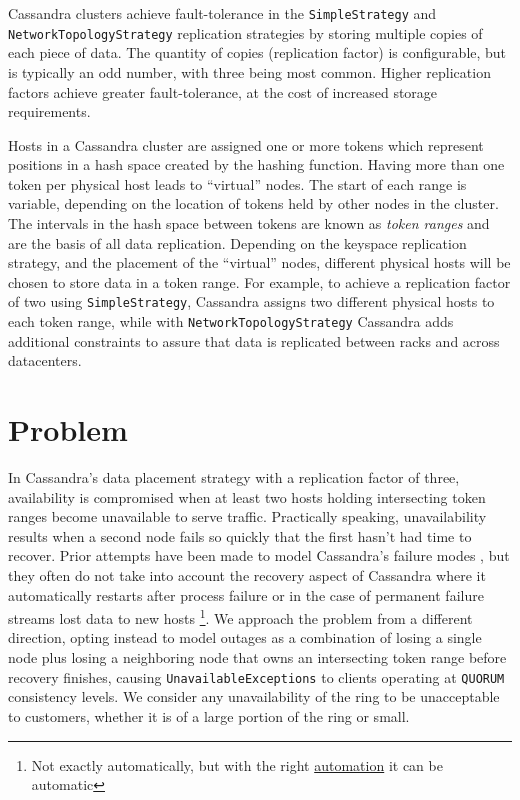 \documentclass{article}
\begin{document}
Cassandra clusters achieve fault-tolerance in the \texttt{SimpleStrategy}
and \\
\texttt{NetworkTopologyStrategy} replication strategies by storing multiple
copies of each piece of data. The quantity of copies (replication factor) is
configurable, but is typically an odd number, with three being most common.
Higher replication factors achieve greater fault-tolerance, at the cost of
increased storage requirements.

Hosts in a Cassandra cluster are assigned one or more tokens which represent
positions in a hash space created by the hashing function. Having more than
one token per physical host leads to ``virtual'' nodes. The start of each
range is variable, depending on the location of tokens held by other nodes
 in the cluster. The intervals in the hash space between tokens are known as
\textit{token ranges} and are the basis of all data replication. Depending on
the keyspace replication strategy, and the placement of the ``virtual'' nodes,
different physical hosts will be chosen to store data in a token range.
For example, to achieve a replication factor of two using
\texttt{SimpleStrategy}, Cassandra assigns two different physical hosts to
each token range, while with \texttt{NetworkTopologyStrategy} Cassandra adds
additional constraints to assure that data is replicated between racks and
across datacenters.

\section{Problem}
\label{sec:problem}

In Cassandra's data placement strategy with a replication factor of three,
availability is compromised when at least two hosts holding intersecting token
ranges become unavailable to serve traffic. Practically speaking, unavailability
results when a second node fails so quickly that the first hasn't had time to recover.
Prior attempts have been made to model Cassandra's failure modes \cite{dataloss},
but they often do not take into account the recovery aspect of Cassandra where
it automatically restarts after process failure or in the case of permanent failure
streams lost data to new hosts \footnote{Not exactly automatically, but with the right
\href{https://github.com/Netflix/Priam}{automation} it can be automatic}.
We approach the problem from a different direction, opting instead to model
outages as a combination of losing a single node plus losing a neighboring node
that owns an intersecting token range before recovery finishes, causing
\texttt{UnavailableExceptions} to clients operating at \texttt{QUORUM} consistency
levels. We consider any unavailability of the ring to be unacceptable to customers,
whether it is of a large portion of the ring or small.
\end{document}
